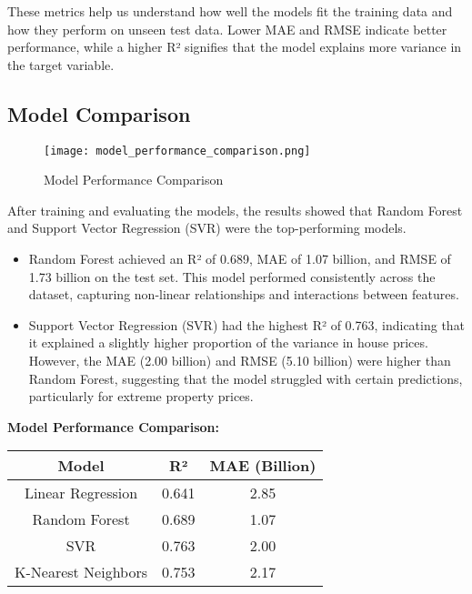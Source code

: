 \documentclass{article}
\begin{document}
These metrics help us understand how well the models fit the training data and how they perform on unseen test data. Lower MAE and RMSE indicate better performance, while a higher R² signifies that the model explains more variance in the target variable.

\subsection{Model Comparison}

\begin{figure}[h]
    \centering
    \texttt{[image: model\_performance\_comparison.png]}
    \caption{Model Performance Comparison}
    \label{fig:model_performance}
\end{figure}

After training and evaluating the models, the results showed that Random Forest and Support Vector Regression (SVR) were the top-performing models.
\begin{itemize}
    \item Random Forest achieved an R² of 0.689, MAE of 1.07 billion, and RMSE of 1.73 billion on the test set. This model performed consistently across the dataset, capturing non-linear relationships and interactions between features.
    \item Support Vector Regression (SVR) had the highest R² of 0.763, indicating that it explained a slightly higher proportion of the variance in house prices. However, the MAE (2.00 billion) and RMSE (5.10 billion) were higher than Random Forest, suggesting that the model struggled with certain predictions, particularly for extreme property prices.
\end{itemize}

\textbf{Model Performance Comparison:}
\begin{center}
\begin{tabular}{ccc}
\toprule
Model                 & R²   & MAE (Billion) \\ 
\midrule
Linear Regression      & 0.641 & 2.85          \\ 
Random Forest          & 0.689 & 1.07          \\ 
SVR                    & 0.763 & 2.00          \\ 
K-Nearest Neighbors    & 0.753 & 2.17          \\ 
\bottomrule
\end{tabular}
\end{center}
\end{document}
